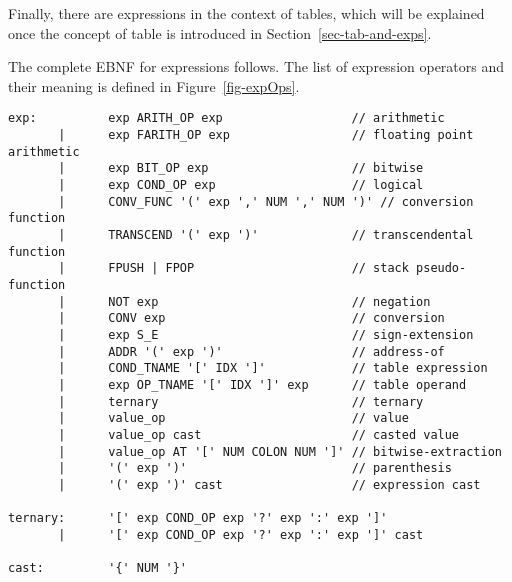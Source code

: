 Finally, there are expressions in the context of tables, which
will be explained once the concept of table is introduced in
Section~\ref{sec-tab-and-exps}.

The complete EBNF for expressions follows.  The list of
expression operators and their meaning is defined in 
Figure~\ref{fig-expOps}.
{\small
\begin{verbatim}
exp:          exp ARITH_OP exp                  // arithmetic 
       |      exp FARITH_OP exp                 // floating point arithmetic 
       |      exp BIT_OP exp                    // bitwise   
       |      exp COND_OP exp                   // logical
       |      CONV_FUNC '(' exp ',' NUM ',' NUM ')' // conversion function
       |      TRANSCEND '(' exp ')'             // transcendental function
       |      FPUSH | FPOP                      // stack pseudo-function
       |      NOT exp                           // negation
       |      CONV exp                          // conversion         
       |      exp S_E                           // sign-extension
       |      ADDR '(' exp ')'                  // address-of
       |      COND_TNAME '[' IDX ']'            // table expression
       |      exp OP_TNAME '[' IDX ']' exp      // table operand   
       |      ternary                           // ternary      
       |      value_op                          // value         
       |      value_op cast                     // casted value
       |      value_op AT '[' NUM COLON NUM ']' // bitwise-extraction
       |      '(' exp ')'                       // parenthesis   
       |      '(' exp ')' cast                  // expression cast  

ternary:      '[' exp COND_OP exp '?' exp ':' exp ']'
       |      '[' exp COND_OP exp '?' exp ':' exp ']' cast
 
cast:         '{' NUM '}'
\end{verbatim}
}


